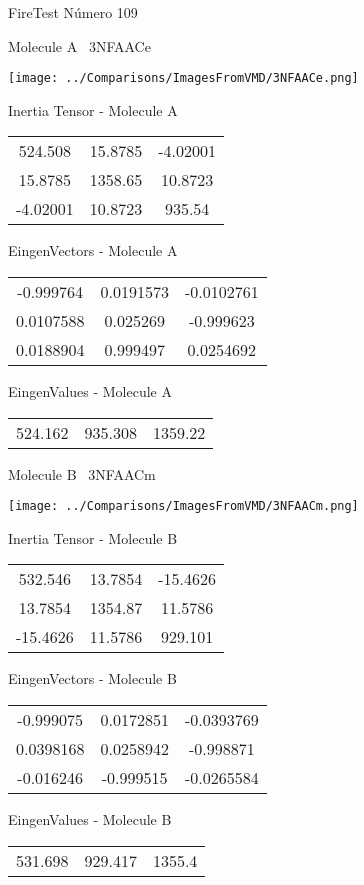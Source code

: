 \vtab[-3cm]
\begin{center}
{\large FireTest \tab Número 109}
\end{center}
\begin{multicols}{2}
\begin{center}

Molecule A \
3NFAACe

\texttt{[image: ../Comparisons/ImagesFromVMD/3NFAACe.png]}

Inertia Tensor - Molecule A \\
\begin{tabular}{|c c c|}
524.508	 & 	15.8785	 & 	-4.02001	 \\
15.8785	 & 	1358.65	 & 	10.8723	 \\
-4.02001	 & 	10.8723	 & 	935.54
\end{tabular}

\vtab
 EingenVectors - Molecule A     \\
\begin{tabular}{|c c c|}
-0.999764	 & 	0.0191573	 & 	-0.0102761	 \\
0.0107588	 & 	0.025269	 & 	-0.999623	 \\
0.0188904	 & 	0.999497	 & 	0.0254692
\end{tabular}

\vtab
 EingenValues - Molecule A     \\
\begin{tabular}{|c c c|}
524.162	 & 	935.308	 & 	1359.22	 \\
\end{tabular}
\columnbreak

Molecule B \
3NFAACm

\texttt{[image: ../Comparisons/ImagesFromVMD/3NFAACm.png]}

Inertia Tensor - Molecule B \\
\begin{tabular}{|c c c|}
532.546	 & 	13.7854	 & 	-15.4626	 \\
13.7854	 & 	1354.87	 & 	11.5786	 \\
-15.4626	 & 	11.5786	 & 	929.101
\end{tabular}

\vtab
 EingenVectors - Molecule B     \\
\begin{tabular}{|c c c|}
-0.999075	 & 	0.0172851	 & 	-0.0393769	 \\
0.0398168	 & 	0.0258942	 & 	-0.998871	 \\
-0.016246	 & 	-0.999515	 & 	-0.0265584
\end{tabular}

\vtab
 EingenValues - Molecule B     \\
\begin{tabular}{|c c c|}
531.698	 & 	929.417	 & 	1355.4	 \\
\end{tabular}

\end{center}
\end{multicols}

